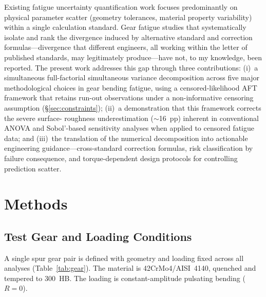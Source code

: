 \documentclass[twocolumn,12pt,a4paper]{article}
\begin{document}
Existing fatigue uncertainty quantification work focuses predominantly
on physical parameter scatter (geometry tolerances, material property
variability) within a single calculation standard. Gear fatigue studies
that systematically isolate and rank the divergence induced by
alternative standard and correction formulas---divergence that different
engineers, all working within the letter of published standards, may
legitimately produce---have not, to my knowledge, been reported. The
present work addresses this gap through three contributions: (i)~a simultaneous
full-factorial
simultaneous variance decomposition across five major methodological
choices in gear bending fatigue, using a censored-likelihood AFT
framework that retains run-out observations under a non-informative censoring assumption (\S\ref{sec:constraints});
(ii)~a demonstration that this framework corrects the severe surface-
roughness underestimation ($\sim$16~pp) inherent in conventional
ANOVA and Sobol'-based sensitivity analyses when applied to censored
fatigue data; and (iii)~the translation of the numerical
decomposition into actionable engineering guidance---cross-standard
correction formulas, risk classification by failure consequence,
and torque-dependent design protocols for controlling prediction
scatter.

\section{Methods}
\label{sec:methods}

\subsection{Test Gear and Loading Conditions}

A single spur gear pair is defined with geometry and loading fixed
across all analyses (Table~\ref{tab:gear}). The material is
42CrMo4/AISI~4140, quenched and tempered to 300~HB. The loading is
constant-amplitude pulsating bending ($R=0$).
\end{document}
